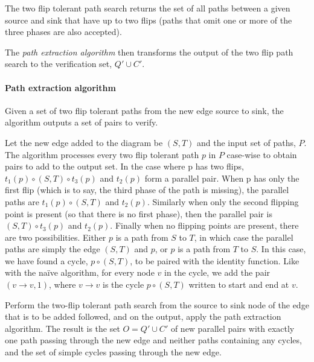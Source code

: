 \documentclass[sigplan,review,anonymous]{acmart}
\begin{document}
The two flip tolerant path search returns the set of all paths between a given source and sink that have up to two flips (paths that omit one or more of the three phases are also accepted).

The \textit{path extraction algorithm} then transforms the output of the two flip path search to the verification set, $Q' \cup C'$.

\paragraph{Path extraction algorithm}
Given a set of two flip tolerant paths from the new edge source to sink, the algorithm outputs a set of pairs to verify.

Let the new edge added to the diagram be $(S, T)$ and the input set of paths, $P$.
The algorithm processes every two flip tolerant path $p$ in $P$ case-wise to obtain pairs to add to the output set.
In the case where p has two flips, $t_1(p) \circ (S, T) \circ t_3(p)$ and $t_2(p)$ form a parallel pair.
When p has only the first flip (which is to say, the third phase of the path is missing), the parallel paths are $t_1(p) \circ (S, T)$ and $t_2(p)$.
Similarly when only the second flipping point is present (so that there is no first phase), then the parallel pair is  $(S, T) \circ t_3(p)$ and $t_2(p)$.
Finally when no flipping points are present, there are two possibilities.
Either $p$ is a path from $S$ to $T$, in which case the parallel paths are simply the edge $(S, T)$ and $p$, or $p$ is a path from $T$ to $S$.
In this case, we have found a cycle, $p \circ (S,T)$, to be paired with the identity function.
Like with the na\"{i}ve algorithm, for every node $v$ in the cycle, we add the pair $(v \rightarrow v, 1)$, where $v \rightarrow v$ is the cycle $p \circ (S,T)$ written to start and end at $v$.

\begin{theorem}
    Perform the two-flip tolerant path search from the source to sink node of the edge that is to be added followed, and on the output, apply the path extraction algorithm. 
    The result is the set $O = Q'\cup C'$ of new parallel pairs with exactly one path passing through the new edge and neither paths containing any cycles, and the set of simple cycles passing through the new edge.
\end{theorem}
\end{document}
